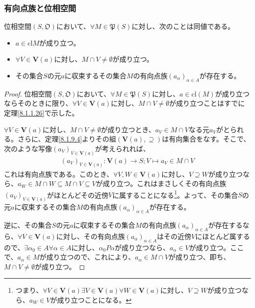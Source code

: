 \documentclass[dvipdfmx]{jsarticle}
\begin{document}
\subsubsection{有向点族と位相空間}%
\begin{thm}\label{8.1.9.7}
位相空間$\left( S,\mathfrak{O} \right)$において、$\forall M \in \mathfrak{P}(S)$に対し、次のことは同値である。
\begin{itemize}
\item
  $a \in {\mathrm{cl}}M$が成り立つ。
\item
  $\forall V \in \mathbf{V}(a)$に対し、$M \cap V \neq \emptyset$が成り立つ。
\item
  その集合$S$の元$a$に収束するその集合$M$の有向点族$\left( a_{\alpha} \right)_{\alpha \in A}$が存在する。
\end{itemize}
\end{thm}
\begin{proof}
位相空間$\left( S,\mathfrak{O} \right)$において、$\forall M \in \mathfrak{P}(S)$に対し、$a \in {\mathrm{cl}}(M)$が成り立つならそのときに限り、$\forall V \in \mathbf{V}(a)$に対し、$M \cap V \neq \emptyset$が成り立つことはすでに定理\ref{8.1.1.26}で示した。\par
$\forall V \in \mathbf{V}(a)$に対し、$M \cap V \neq \emptyset$が成り立つとき、$a_{V} \in M \cap V$なる元$a_{V}$がとられる。さらに、定理\ref{8.1.9.4}よりその組$\left( \mathbf{V}(a), \supseteq \right)$は有向集合をなす。そこで、次のような写像$\left( a_{V} \right)_{V \in \mathbf{V}(a)}$が考えられれば、
\begin{align*}
\left( a_{V} \right)_{V \in \mathbf{V}(a)}:\mathbf{V}(a) \rightarrow S;V \mapsto a_{V} \in M \cap V
\end{align*}
これは有向点族である。このとき、$\forall V,W \in \mathbf{V}(a)$に対し、$V \supseteq W$が成り立つなら、$a_{W} \in M \cap W \subseteq M \cap V \subseteq V$が成り立つ。これはまさしくその有向点族$\left( a_{V} \right)_{V \in \mathbf{V}(a)}$がほとんどその近傍$V$に属することになる\footnote{つまり、$\forall V \in \mathbf{V}(a)\exists V \in \mathbf{V}(a)\forall W \in \mathbf{V}(a)$に対し、$V \supseteq W$が成り立つなら、$a_{W} \in V$が成り立つことになる。}。よって、その集合$S$の元$a$に収束するその集合$M$の有向点族$\left( a_{\alpha} \right)_{\alpha \in A}$が存在する。\par
逆に、その集合$S$の元$a$に収束するその集合$M$の有向点族$\left( a_{\alpha} \right)_{\alpha \in A}$が存在するなら、$\forall V \in \mathbf{V}(a)$に対し、その有向点族$\left( a_{\alpha} \right)_{\alpha \in A}$はその近傍$V$にほとんど属するので、$\exists\alpha_{0} \in A\forall\alpha \in A$に対し、$\alpha_{0}P\alpha$が成り立つなら、$a_{\alpha} \in V$が成り立つ。ここで、$a_{\alpha} \in M$が成り立つので、これにより、$a_{\alpha} \in M \cap V$が成り立つ、即ち、$M \cap V \neq \emptyset$が成り立つ。
\end{proof}
\end{document}

